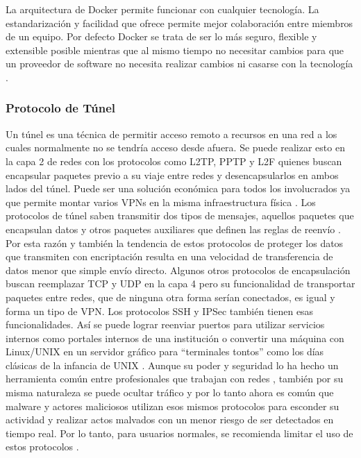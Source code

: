 La arquitectura de Docker permite funcionar con cualquier tecnología. La estandarización y facilidad que ofrece permite mejor colaboración entre miembros de un equipo. Por defecto Docker se trata de ser lo más seguro, flexible y extensible posible mientras que al mismo tiempo no necesitar cambios para que un proveedor de software no necesita realizar cambios ni casarse con la tecnología \citep{Docker}.


\subsubsection{Protocolo de Túnel}
Un túnel es una técnica de permitir acceso remoto a recursos en una red a los cuales normalmente no se tendría acceso desde afuera. Se puede realizar esto en la capa 2 de redes con los protocolos como L2TP, PPTP y L2F quienes buscan encapsular paquetes previo a su viaje entre redes y desencapsularlos en ambos lados del túnel. Puede ser una solución económica para todos los involucrados ya que permite montar varios VPNs en la misma infraestructura física \citep{Cisco-Tunneling}. Los protocolos de túnel saben transmitir dos tipos de mensajes, aquellos paquetes que encapsulan datos y otros paquetes auxiliares que definen las reglas de reenvío \citep{Kaspersky-Tunneling}. Por esta razón y también la tendencia de estos protocolos de proteger los datos que transmiten con encriptación resulta en una velocidad de transferencia de datos menor que simple envío directo. Algunos otros protocolos de encapsulación buscan reemplazar TCP y UDP en la capa 4 pero su funcionalidad de transportar paquetes entre redes, que de ninguna otra forma serían conectados, es igual y forma un tipo de VPN. Los protocolos SSH y IPSec también tienen esas funcionalidades. Así se puede lograr reenviar puertos para utilizar servicios internos como portales internos de una institución o convertir una máquina con Linux/UNIX en un servidor gráfico para “terminales tontos” \citep{ENP-Tunneling} como los días clásicas de la infancia de UNIX \citep{GeerlingJeff-History-Remote-Access}. Aunque su poder y seguridad lo ha hecho un herramienta común entre profesionales que trabajan con redes \citep{ENP-Tunneling}, también por su misma naturaleza se puede ocultar tráfico y por lo tanto ahora es común que malware y actores maliciosos utilizan esos mismos protocolos para esconder su actividad y realizar actos malvados con un menor riesgo de ser detectados en tiempo real. Por lo tanto, para usuarios normales, se recomienda limitar el uso de estos protocolos \citep{Kaspersky-Tunneling}.

